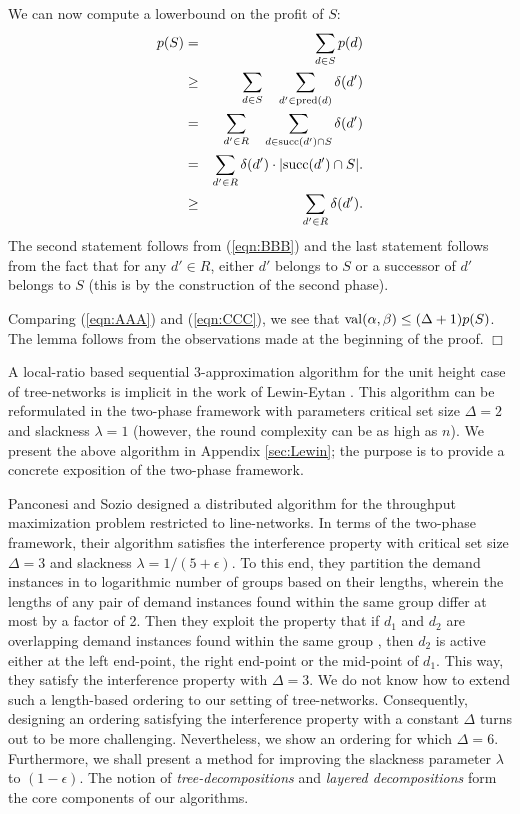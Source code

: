 \documentclass[11pt]{article}
\newcommand{\qed} {\hfill$\Box$}
\newcommand{\val} {{\rm val}}
\newcommand{\mypred} {{\rm pred}}
\newcommand{\mysucc} {{\rm succ}}
\begin{document}
We can now compute a lowerbound on the profit of $S$:
\begin{eqnarray}
\nonumber
p(S) 
&=& \sum_{d\in S} p(d)\\
\nonumber
&\geq & \sum_{d\in S} \quad \sum_{d'\in \mypred(d)} \delta(d')\\
\nonumber
&=& \sum_{d'\in R} \quad \sum_{d\in \mysucc(d') \cap S} \delta(d')\\
\nonumber
&=& \sum_{d'\in R}\delta(d')\cdot |\mysucc(d')\cap S|.\\
\label{eqn:CCC}
&\geq & \sum_{d'\in R} \delta(d').
\end{eqnarray}
The second statement follows from (\ref{eqn:BBB}) and 
the last statement follows from the fact that for any $d'\in R$, either $d'$ belongs to $S$
or a successor of $d'$ belongs to $S$ (this is by the construction of the second phase).

Comparing (\ref{eqn:AAA}) and (\ref{eqn:CCC}), we see that $\val(\alpha,\beta)\leq (\Delta+1)p(S)$.
The lemma follows from the observations made at the beginning of the proof.
\qed

A local-ratio based sequential $3$-approximation algorithm for the unit height case of tree-networks
is implicit in the work of Lewin-Eytan \cite{Lewin-Eytan}.
This algorithm can be reformulated in the two-phase framework with parameters 
critical set size $\Delta=2$ and slackness $\lambda=1$ (however, the round complexity can be as high as $n$).
We present the above algorithm in Appendix \ref{sec:Lewin};
the purpose is to provide a concrete exposition of the two-phase framework.

Panconesi and Sozio \cite{Pancj} designed a distributed algorithm for the 
throughput maximization problem restricted to line-networks.
In terms of the two-phase framework, their algorithm satisfies the interference property
with critical set size $\Delta=3$ and slackness $\lambda=1/(5+\epsilon)$.
To this end, they partition the demand instances in to logarithmic number of groups
based on their lengths, wherein the lengths of any pair of demand instances found within the same group 
differ at most by a factor of 2. Then they exploit the property that if $d_1$ and $d_2$
are overlapping demand instances found within the same group , 
then $d_2$ is active either at the left end-point, the right end-point or the mid-point of $d_1$.
This way, they satisfy the interference property with $\Delta=3$.
We do not know how to extend such a length-based ordering to our setting of tree-networks.
Consequently, designing an ordering satisfying the interference property with a constant $\Delta$ 
turns out to be more challenging. Nevertheless, we show an ordering for which $\Delta=6$.
Furthermore, we shall present a method for improving the slackness parameter $\lambda$ to $(1-\epsilon)$.
The notion of {\em tree-decompositions} and {\em layered decompositions} form the core components
of our algorithms.
\end{document}
